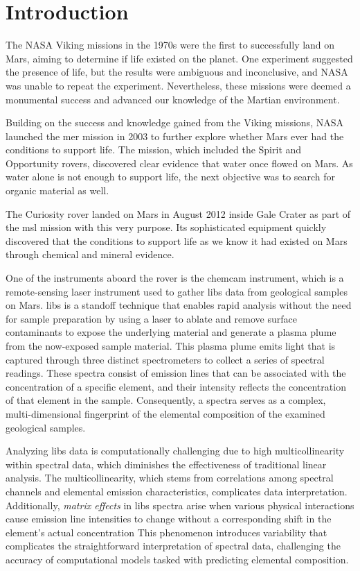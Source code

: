 \section{Introduction}\label{sec:introduction}
The NASA Viking missions in the 1970s were the first to successfully land on Mars, aiming to determine if life existed on the planet.
One experiment suggested the presence of life, but the results were ambiguous and inconclusive, and NASA was unable to repeat the experiment.
Nevertheless, these missions were deemed a monumental success and advanced our knowledge of the Martian environment.\cite{marsnasagov_vikings}

Building on the success and knowledge gained from the Viking missions, NASA launched the \gls{mer} mission in 2003 to further explore whether Mars ever had the conditions to support life.
The mission, which included the Spirit and Opportunity rovers, discovered clear evidence that water once flowed on Mars.
As water alone is not enough to support life, the next objective was to search for organic material as well.\cite{marsnasagov_observer, marsnasagov_spirit_opportunity}

The Curiosity rover landed on Mars in August 2012 inside Gale Crater as part of the \gls{msl} mission with this very purpose.
Its sophisticated equipment quickly discovered that the conditions to support life as we know it had existed on Mars through chemical and mineral evidence.\cite{marsnasagov_chemcam}

One of the instruments aboard the rover is the \gls{chemcam} instrument, which is a remote-sensing laser instrument used to gather \gls{libs} data from geological samples on Mars.
\gls{libs} is a standoff technique that enables rapid analysis without the need for sample preparation by using a laser to ablate and remove surface contaminants to expose the underlying material and generate a plasma plume from the now-exposed sample material.
This plasma plume emits light that is captured through three distinct spectrometers to collect a series of spectral readings.
These spectra consist of emission lines that can be associated with the concentration of a specific element, and their intensity reflects the concentration of that element in the sample.
Consequently, a spectra serves as a complex, multi-dimensional fingerprint of the elemental composition of the examined geological samples.\cite{cleggRecalibrationMarsScience2017}

Analyzing \gls{libs} data is computationally challenging due to high multicollinearity within spectral data, which diminishes the effectiveness of traditional linear analysis.
The multicollinearity, which stems from correlations among spectral channels and elemental emission characteristics, complicates data interpretation.
Additionally, \textit{matrix effects} in \gls{libs} spectra arise when various physical interactions cause emission line intensities to change without a corresponding shift in the element's actual concentration
This phenomenon introduces variability that complicates the straightforward interpretation of spectral data, challenging the accuracy of computational models tasked with predicting elemental composition.\cite{andersonImprovedAccuracyQuantitative2017}

